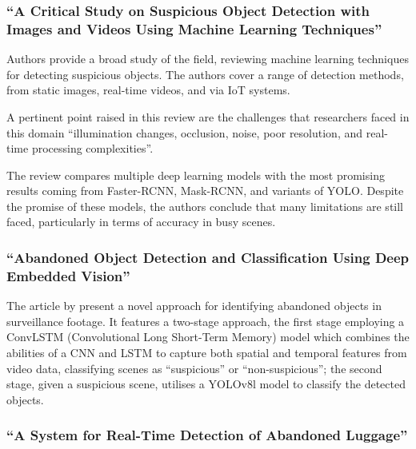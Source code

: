 \subsubsection[A Critical Study on Suspicious Object Detection with Images and Videos Using Machine Learning Techniques]
{\enquote{A Critical Study on Suspicious Object Detection with Images and Videos Using Machine Learning Techniques} \protect\citep{dubey2024critical}}

Authors \citeauthor{dubey2024critical} provide a broad study of the field,
reviewing machine learning techniques for detecting suspicious objects. The
authors cover a range of detection methods, from static images, real-time
videos, and via IoT systems.

A pertinent point raised in this review are the challenges that researchers
faced in this domain \enquote{illumination changes, occlusion, noise, poor
	resolution, and real-time processing complexities}.

The review compares multiple deep learning models with the most promising
results coming from Faster-RCNN, Mask-RCNN, and variants of YOLO. Despite the
promise of these models, the authors conclude that many limitations are still
faced, particularly in terms of accuracy in busy scenes.

\subsubsection[Abandoned Object Detection and Classification Using Deep Embedded Vision]
{\enquote{Abandoned Object Detection and Classification Using Deep Embedded Vision} \protect\citep{qasim2024abandoned}}

The article by \cite{qasim2024abandoned} present a novel approach for
identifying abandoned objects in surveillance footage. It features a two-stage
approach, the first stage employing a ConvLSTM (Convolutional Long Short-Term
Memory) model which combines the abilities of a CNN and LSTM to capture both
spatial and temporal features from video data, classifying scenes as
\enquote{suspicious} or \enquote{non-suspicious}; the second stage, given a
suspicious scene, utilises a YOLOv8l model to classify the detected objects.

\subsubsection[A System for Real-Time Detection of Abandoned Luggage]
{\enquote{A System for Real-Time Detection of Abandoned Luggage} \protect\citep{abandoned2025vrsalovic}}

